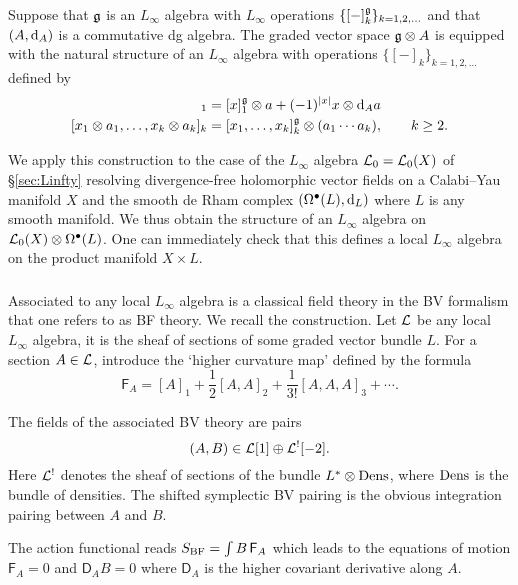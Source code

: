 \documentclass[11pt]{amsart}
\begin{document}
\subsubsection{}
Suppose that $\mathfrak g$ is an $L_\infty$ algebra with $L_\infty$ operations $\{[-]^\mathfrak g_k\}_{k=1,2,\ldots}$ and that $(A, {\rm d}_A)$ is a commutative dg algebra. 
The graded vector space $\mathfrak g \otimes A$ is equipped with the natural structure of an $L_\infty$ algebra with operations $\{[-]_k\}_{k=1,2,\ldots}$ defined by
\begin{align*}
[x \otimes a]_1 & = [x]^\fg_1 \otimes a + (-1)^{|x|} x \otimes \d_A a \\
[x_1 \otimes a_1, \ldots , x_k \otimes a_k]_k & = [x_1,\ldots,x_k]^\fg_k \otimes (a_1 \cdots a_k), \qquad k \geq 2 .
\end{align*}

We apply this construction to the case of the $L_\infty$ algebra $\mathcal L_0 = \mathcal L_0 (X)$ of \S \ref{sec:Linfty} resolving divergence-free holomorphic vector fields on a Calabi--Yau manifold $X$ and the smooth de Rham complex $(\Omega^\bullet(L) , {\rm d}_L)$ where $L$ is any smooth manifold. 
We thus obtain the structure of an $L_\infty$ algebra on $\mathcal L_0(X) \otimes \Omega^{\bullet}(L)$. 
One can immediately check that this defines a local $L_\infty$ algebra on the product manifold $X \times L$. 

\subsubsection{}

Associated to any local $L_\infty$ algebra is a classical field theory in the BV formalism that one refers to as BF theory.
We recall the construction. 
Let $\mathcal L$ be any local $L_\infty$ algebra, it is the sheaf of sections of some graded vector bundle $L$. 
For a section $A \in \mathcal L$, introduce the `higher curvature map' defined by the formula
\[
\mathsf{F}_A = [A]_1 + \frac12 [A,A]_2 + \frac{1}{3!} [A,A,A]_3 + \cdots .
\]

The fields of the associated BV theory are pairs
\[
  (A, B) \in \mathcal L[1] \oplus \mathcal L^{!}[-2] .
\]
Here $\mathcal L^!$ denotes the sheaf of sections of the bundle $L^* \otimes {\rm Dens}$, where ${\rm Dens}$ is the bundle of densities. 
The shifted symplectic BV pairing is the obvious integration pairing between $A$ and $B$. 

The action functional reads $S_{\rm BF} = \int B \, \mathsf{F}_{A}$ which leads to the equations of motion $\mathsf{F}_{A} = 0$ and $\mathsf{D}_A B= 0$ where $\mathsf{D}_A$ is the higher covariant derivative along $A$. 
\end{document}
